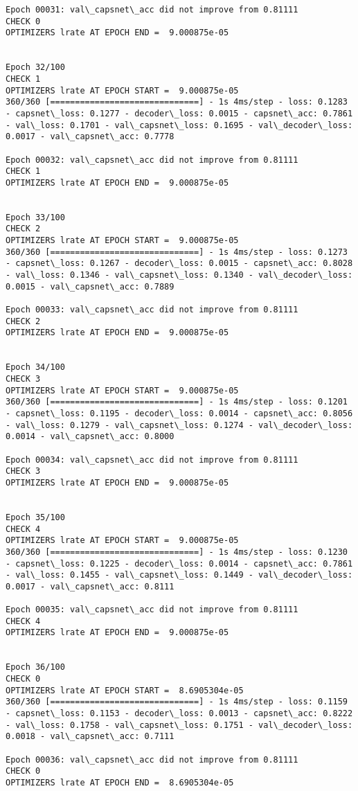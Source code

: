 \documentclass[11pt]{article}
\begin{document}
\begin{Verbatim}[commandchars=\\\{\}]
Epoch 00031: val\_capsnet\_acc did not improve from 0.81111
CHECK 0
OPTIMIZERS lrate AT EPOCH END =  9.000875e-05 


Epoch 32/100
CHECK 1
OPTIMIZERS lrate AT EPOCH START =  9.000875e-05
360/360 [==============================] - 1s 4ms/step - loss: 0.1283 - capsnet\_loss: 0.1277 - decoder\_loss: 0.0015 - capsnet\_acc: 0.7861 - val\_loss: 0.1701 - val\_capsnet\_loss: 0.1695 - val\_decoder\_loss: 0.0017 - val\_capsnet\_acc: 0.7778

Epoch 00032: val\_capsnet\_acc did not improve from 0.81111
CHECK 1
OPTIMIZERS lrate AT EPOCH END =  9.000875e-05 


Epoch 33/100
CHECK 2
OPTIMIZERS lrate AT EPOCH START =  9.000875e-05
360/360 [==============================] - 1s 4ms/step - loss: 0.1273 - capsnet\_loss: 0.1267 - decoder\_loss: 0.0015 - capsnet\_acc: 0.8028 - val\_loss: 0.1346 - val\_capsnet\_loss: 0.1340 - val\_decoder\_loss: 0.0015 - val\_capsnet\_acc: 0.7889

Epoch 00033: val\_capsnet\_acc did not improve from 0.81111
CHECK 2
OPTIMIZERS lrate AT EPOCH END =  9.000875e-05 


Epoch 34/100
CHECK 3
OPTIMIZERS lrate AT EPOCH START =  9.000875e-05
360/360 [==============================] - 1s 4ms/step - loss: 0.1201 - capsnet\_loss: 0.1195 - decoder\_loss: 0.0014 - capsnet\_acc: 0.8056 - val\_loss: 0.1279 - val\_capsnet\_loss: 0.1274 - val\_decoder\_loss: 0.0014 - val\_capsnet\_acc: 0.8000

Epoch 00034: val\_capsnet\_acc did not improve from 0.81111
CHECK 3
OPTIMIZERS lrate AT EPOCH END =  9.000875e-05 


Epoch 35/100
CHECK 4
OPTIMIZERS lrate AT EPOCH START =  9.000875e-05
360/360 [==============================] - 1s 4ms/step - loss: 0.1230 - capsnet\_loss: 0.1225 - decoder\_loss: 0.0014 - capsnet\_acc: 0.7861 - val\_loss: 0.1455 - val\_capsnet\_loss: 0.1449 - val\_decoder\_loss: 0.0017 - val\_capsnet\_acc: 0.8111

Epoch 00035: val\_capsnet\_acc did not improve from 0.81111
CHECK 4
OPTIMIZERS lrate AT EPOCH END =  9.000875e-05 


Epoch 36/100
CHECK 0
OPTIMIZERS lrate AT EPOCH START =  8.6905304e-05
360/360 [==============================] - 1s 4ms/step - loss: 0.1159 - capsnet\_loss: 0.1153 - decoder\_loss: 0.0013 - capsnet\_acc: 0.8222 - val\_loss: 0.1758 - val\_capsnet\_loss: 0.1751 - val\_decoder\_loss: 0.0018 - val\_capsnet\_acc: 0.7111

Epoch 00036: val\_capsnet\_acc did not improve from 0.81111
CHECK 0
OPTIMIZERS lrate AT EPOCH END =  8.6905304e-05 



\end{Verbatim}
\end{document}
